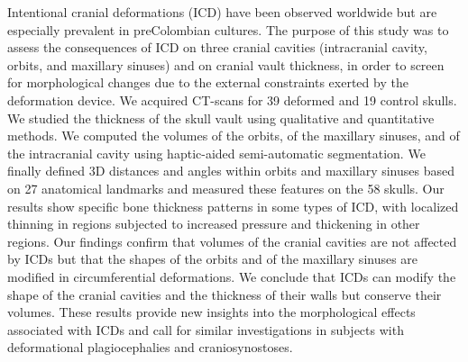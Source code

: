 {{\begin{enumerate}
Intentional cranial deformations (ICD) have been observed worldwide but are especially prevalent in preColombian cultures. The purpose of this study was to assess the consequences of ICD on three cranial cavities (intracranial cavity, orbits, and maxillary sinuses) and on cranial vault thickness, in order to screen for morphological changes due to the external constraints exerted by the deformation device. We acquired CT-scans for 39 deformed and 19 control skulls. We studied the thickness of the skull vault using qualitative and quantitative methods. We computed the volumes of the orbits, of the maxillary sinuses, and of the intracranial cavity using haptic-aided semi-automatic segmentation. We finally defined 3D distances and angles within orbits and maxillary sinuses based on 27 anatomical landmarks and measured these features on the 58 skulls. Our results show specific bone thickness patterns in some types of ICD, with localized thinning in regions subjected to increased pressure and thickening in other regions. Our findings confirm that volumes of the cranial cavities are not affected by ICDs but that the shapes of the orbits and of the maxillary sinuses are modified in circumferential deformations. We conclude that ICDs can modify the shape of the cranial cavities and the thickness of their walls but conserve their volumes. These results provide new insights into the morphological effects associated with ICDs and call for similar investigations in subjects with deformational plagiocephalies and craniosynostoses.


\end{enumerate}}}
